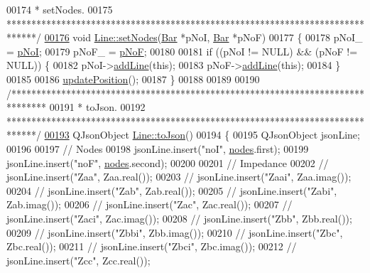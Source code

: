 \begin{DoxyCode}
00174 \textcolor{comment}{ * setNodes.}
00175 \textcolor{comment}{ ******************************************************************************/}
\hypertarget{line_8cpp_source_l00176}{}\hyperlink{group___models_gaeeab146e6c1d7d1a688a2764a9c9a170}{00176} \textcolor{keywordtype}{void} \hyperlink{group___models_gaeeab146e6c1d7d1a688a2764a9c9a170}{Line::setNodes}(\hyperlink{class_bar}{Bar} *pNoI, \hyperlink{class_bar}{Bar} *pNoF)
00177 \{
00178   pNoI\_ = \hyperlink{group___models_gaeafd90e84ac2f8de2a879abe9e53eef3}{pNoI};
00179   pNoF\_ = \hyperlink{group___models_gabbc73ddedd3075c33ae5331bd7c9829f}{pNoF};
00180 
00181   \textcolor{keywordflow}{if} ((pNoI != NULL) && (pNoF != NULL)) \{
00182     pNoI->\hyperlink{group___models_ga8cbd2f62d92e69ce6c8d561b682464b6}{addLine}(\textcolor{keyword}{this});
00183     pNoF->\hyperlink{group___models_ga8cbd2f62d92e69ce6c8d561b682464b6}{addLine}(\textcolor{keyword}{this});
00184   \}
00185 
00186   \hyperlink{group___models_ga8fdb12651d4bc592616d241386b066b3}{updatePosition}();
00187 \}
00188 
00189 
00190 \textcolor{comment}{/*******************************************************************************}
00191 \textcolor{comment}{ * toJson.}
00192 \textcolor{comment}{ ******************************************************************************/}
\hypertarget{line_8cpp_source_l00193}{}\hyperlink{group___models_ga4effa7a96db465ea6e01135d5a010739}{00193} QJsonObject \hyperlink{group___models_ga4effa7a96db465ea6e01135d5a010739}{Line::toJson}()
00194 \{
00195   QJsonObject jsonLine;
00196 
00197   \textcolor{comment}{// Nodes}
00198   jsonLine.insert(\textcolor{stringliteral}{"noI"}, \hyperlink{class_line_afd17c40d656e6a8d677cb22df5f0c70b}{nodes}.first);
00199   jsonLine.insert(\textcolor{stringliteral}{"noF"}, \hyperlink{class_line_afd17c40d656e6a8d677cb22df5f0c70b}{nodes}.second);
00200 
00201   \textcolor{comment}{// Impedance}
00202 \textcolor{comment}{//  jsonLine.insert("Zaa", Zaa.real());}
00203 \textcolor{comment}{//  jsonLine.insert("Zaai", Zaa.imag());}
00204 \textcolor{comment}{//  jsonLine.insert("Zab", Zab.real());}
00205 \textcolor{comment}{//  jsonLine.insert("Zabi", Zab.imag());}
00206 \textcolor{comment}{//  jsonLine.insert("Zac", Zac.real());}
00207 \textcolor{comment}{//  jsonLine.insert("Zaci", Zac.imag());}
00208 \textcolor{comment}{//  jsonLine.insert("Zbb", Zbb.real());}
00209 \textcolor{comment}{//  jsonLine.insert("Zbbi", Zbb.imag());}
00210 \textcolor{comment}{//  jsonLine.insert("Zbc", Zbc.real());}
00211 \textcolor{comment}{//  jsonLine.insert("Zbci", Zbc.imag());}
00212 \textcolor{comment}{//  jsonLine.insert("Zcc", Zcc.real());}

\end{DoxyCode}
